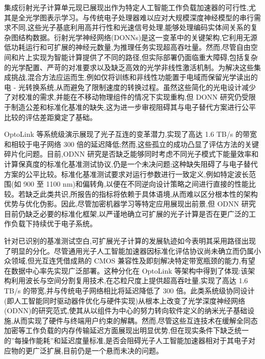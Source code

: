 集成衍射光子计算单元现已展现出作为特定人工智能工作负载加速器的可行性,尤其是全光学图表示学习。与传统电子处理器难以应对大规模深度神经模型的串行需求不同,这些光子基底利用高并行性和光速信号处理,能够处理编码实体间关系的复杂图结构数据。衍射光学神经网络(DONNs)是这一变革中的关键架构,它利用无源低功耗运行和可扩展的神经元数量,为推理任务实现超高吞吐量。然而,尽管自由空间和片上实现为智能计算提供了不同的路径,但实际部署仍面临重大障碍,包括复杂的光学配置、严苛的对准要求以及缺乏高效的光学非线性激活机制。为解决这些集成挑战,混合方法应运而生,例如仅将训练和非线性功能置于电域而保留光学读出的电 - 光转换系统,从而避免了限制速度的转换过程。虽然这些简化的光电设计减少了对校准的需求,并能在不移动物理组件的情况下实现重构,但 DONN 研究仍受限于制造公差和标准化基准的缺失,这为进一步审视阻碍其与电子替代方案进行公平比较的评估差距奠定了基础。\citep{doi_10_1126_sciadv_abn7630_4399f2ff} \citep{doi_10_1002_nap2_70098_8d5f2f8a} \citep{doi_10_1364_oe_462370_1269b480}

OptoLink 等系统级演示展现了光子互连的变革潜力,实现了高达 1.6 TB/s 的带宽和相较于电子网络 300 倍的延迟降低;然而,这些孤立的成功凸显了评估方法的关键碎片化问题。目前,ODNN 研究是否缺乏能够同时考虑不同光子模式下能量效率和计算保真度的标准化基准测试协议,仍是一个未决问题;这种缺失阻碍了与电子替代方案的公平比较。标准化基准测试要求对运行参数进行一致定义,例如特定波长范围(如 900 至 1100 nm)和偏转角,以便在不同逆向设计策略之间进行直接的性能比较。若缺乏此类共识,所报告的指标将依赖于具体语境,从而难以区分根本性的架构优势与优化伪影。因此,尽管加密机器学习等特定应用展现出前景,但 ODNN 研究目前仍缺乏必要的标准化框架,以严谨地确立可扩展的光子计算是否在更广泛的工作负载下持续优于电子系统。\citep{doi_10_1145_3806395_315ab915} \citep{doi_10_1515_nanoph_2023_0852_cb27a26f} \citep{s2_9b444e84d20ae6e3d62d2d4df30268b5a53baad2_40af2cc9}

针对已识别的基准测试空白,可扩展光子计算的发展轨迹如今表明其采用路径出现了明显的分化。尽管通用光子人工智能加速器因标准化评估协议尚未确立而仍属小众领域,但光互连凭借成熟的 CMOS 兼容性及即刻解决特定带宽瓶颈的能力,有望在数据中心率先实现广泛部署。这种分化在 OptoLink 等架构中得到了体现:该架构利用波长与空间分割复用技术,在芯粒尺度上提供超高吞吐量,实现了高达 1.6 TB/s 的带宽,并与传统电子网络相比将延迟降低了 300 倍。此类系统级协同设计(即人工智能同时驱动器件优化与硬件实现)从根本上改变了光学深度神经网络(ODNN)的研究范式,使其从以组件为中心的努力转向软件定义的纳米光子基础设施,从而实现了硬件与终端用户约束的解耦。然而,尽管这些互连技术在缓解全同态加密等工作负载的内存传输延迟方面展现出明显优势,但在现实条件下缺乏统一的''每操作能耗''和延迟度量标准,是否会阻碍光子人工智能加速器相对于其电子对应物的更广泛扩展,目前仍是一个悬而未决的问题。\citep{doi_10_1145_3806395_315ab915} \citep{doi_10_1016_j_pquantelec_2023_100469_e4974ca6}

